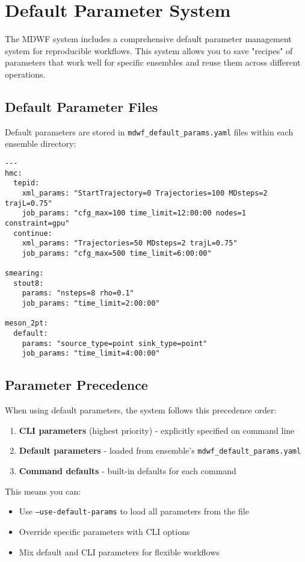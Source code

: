 \documentclass{article}
\begin{document}
\section{Default Parameter System}

The MDWF system includes a comprehensive default parameter management system for reproducible workflows. This system allows you to save "recipes" of parameters that work well for specific ensembles and reuse them across different operations.

\subsection{Default Parameter Files}

Default parameters are stored in \texttt{mdwf\_default\_params.yaml} files within each ensemble directory:

\begin{lstlisting}
---
hmc:
  tepid:
    xml_params: "StartTrajectory=0 Trajectories=100 MDsteps=2 trajL=0.75"
    job_params: "cfg_max=100 time_limit=12:00:00 nodes=1 constraint=gpu"
  continue:
    xml_params: "Trajectories=50 MDsteps=2 trajL=0.75"
    job_params: "cfg_max=500 time_limit=6:00:00"
    
smearing:
  stout8:
    params: "nsteps=8 rho=0.1"
    job_params: "time_limit=2:00:00"

meson_2pt:
  default:
    params: "source_type=point sink_type=point"
    job_params: "time_limit=4:00:00"
\end{lstlisting}

\subsection{Parameter Precedence}

When using default parameters, the system follows this precedence order:

\begin{enumerate}
\item \textbf{CLI parameters} (highest priority) - explicitly specified on command line
\item \textbf{Default parameters} - loaded from ensemble's \texttt{mdwf\_default\_params.yaml}
\item \textbf{Command defaults} - built-in defaults for each command
\end{enumerate}

This means you can:
\begin{itemize}
\item Use \texttt{--use-default-params} to load all parameters from the file
\item Override specific parameters with CLI options
\item Mix default and CLI parameters for flexible workflows
\end{itemize}
\end{document}
